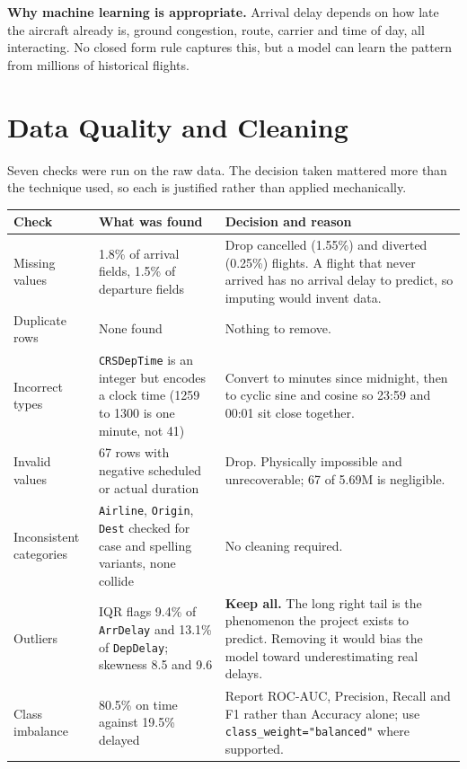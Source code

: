 \documentclass[11pt,a4paper]{article}
\begin{document}
\textbf{Why machine learning is appropriate.} Arrival delay depends on how late the
aircraft already is, ground congestion, route, carrier and time of day, all interacting.
No closed form rule captures this, but a model can learn the pattern from millions of
historical flights.

\section{Data Quality and Cleaning}

Seven checks were run on the raw data. The decision taken mattered more than the
technique used, so each is justified rather than applied mechanically.

\begin{center}
\small
\begin{tabular}{@{}p{3.5cm} p{5.3cm} p{5.8cm}@{}}
\toprule
\textbf{Check} & \textbf{What was found} & \textbf{Decision and reason} \\
\midrule
Missing values & 1.8\% of arrival fields, 1.5\% of departure fields &
Drop cancelled (1.55\%) and diverted (0.25\%) flights. A flight that never arrived has
no arrival delay to predict, so imputing would invent data. \\
Duplicate rows & None found & Nothing to remove. \\
Incorrect types & \texttt{CRSDepTime} is an integer but encodes a clock time (1259 to
1300 is one minute, not 41) &
Convert to minutes since midnight, then to cyclic sine and cosine so 23:59 and 00:01 sit
close together. \\
Invalid values & 67 rows with negative scheduled or actual duration &
Drop. Physically impossible and unrecoverable; 67 of 5.69M is negligible. \\
Inconsistent categories & \texttt{Airline}, \texttt{Origin}, \texttt{Dest} checked for
case and spelling variants, none collide &
No cleaning required. \\
Outliers & IQR flags 9.4\% of \texttt{ArrDelay} and 13.1\% of \texttt{DepDelay};
skewness 8.5 and 9.6 &
\textbf{Keep all.} The long right tail is the phenomenon the project exists to predict.
Removing it would bias the model toward underestimating real delays. \\
Class imbalance & 80.5\% on time against 19.5\% delayed &
Report ROC-AUC, Precision, Recall and F1 rather than Accuracy alone; use
\texttt{class\_weight="balanced"} where supported. \\
\bottomrule
\end{tabular}
\end{center}
\end{document}
